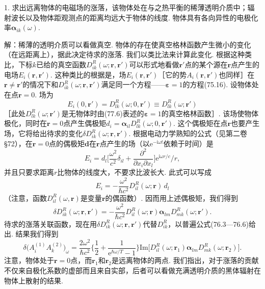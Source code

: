 \begin{xiti}

1. 求出远离物体的电磁场的涨落，该物体处在与之热平衡的稀薄透明介质中；辐射波长以及物体距观测点的距离均远大于物体的线度. 物体具有各向异性的电极化率$\bm{\alpha}_{ik}(\omega)$.

{\heiti 解：}稀薄的透明介质可以看做真空. 物体的存在使真空格林函数产生微小的变化（在远距离上），据此决定待求的涨落. 我们以类比法来计算此变化. 根据这种类比，下标$k$已给的真空函数$D_{ik}^{R}(\omega;\bm{r},\bm{r}')$可以形式地看做$\bm{r}'$点的某个源在$\bm{r}$点产生的电场$E_{i}(\bm{r},\bm{r}')$. 这种类比的根据是，场$E_{i}(\bm{r},\bm{r}')$［它的势$A_{i}(\bm{r},\bm{r}')$也同样］在$\bm{r}\neq\bm{r}'$的情况下和$D_{ik}^{R}(\omega;\bm{r},\bm{r}')$满足同一个方程——$\bm{\varepsilon}=1$的方程(75.16). 设物体处在点$\bm{r}=0$. 场为
\begin{equation*}
E_{i}(0,\bm{r}')=D_{lk}^{R}(\omega;0,\bm{r}')\equiv D_{lk}^{R}(\omega;\bm{r}')
\end{equation*}
［此处$D_{lk}^{R}(\omega;\bm{r}')$是无物体时由(77.6)表述的$\bm{\varepsilon}=1$的真空格林函数］. 该场使物体极化，同时在$\bm{r}=0$点产生偶极矩$d_{i}=\bm{\alpha}_{il}D_{lk}^{R}(\omega;0,\bm{r}')$. 这个偶极矩在点$\bm{r}$也要产生场，它将给出待求的变化$\delta D_{ik}^{R}(\omega;\bm{r},\bm{r}')$. 根据电动力学熟知的公式（见第二卷§72），在$\bm{r}=0$点的偶极矩$\bm{d}$在$\bm{r}$点产生的场（以$\mathrm{e}^{-\mathrm{i}\omega t}$依赖于时间）是
\begin{equation*}
E_{i}=d_{l}\biggl[\frac{\omega^{2}}{c^{2}}\delta_{il}+\frac{\partial^{2}}{\partial x_{i}\partial x_{l}}\biggr]\mathrm{e}^{\mathrm{i}\omega r/c}/r,
\end{equation*}
并且只要求距离$r$比物体的线度大，不要求比波长大. 此式可以写成
\begin{equation*}
E_{i}=-\frac{\omega^{2}}{\hbar c^{2}}D_{il}^{R}(\omega;\bm{r})\,d_{l}
\end{equation*}
（注意，函数$D_{il}^{R}(\omega,\bm{r})$是变量$\bm{r}$的偶函数）. 因而用上述偶极矩，我们得到
\begin{equation*}
\delta D_{ik}^{R}(\omega;\bm{r},\bm{r}')=-\frac{\omega^{2}}{\hbar c^{2}}D_{il}^{R}(\omega;\bm{r})\bm{\alpha}_{lm}D_{mk}^{R}(\omega;\bm{r}').
\end{equation*}
待求的涨落关联函数，现在用$\delta D_{ik}^{R}(\omega;\bm{r},\bm{r}')$代替$D_{ik}^{R}$，以普遍公式(76.3—76.6)给出. 结果我们得到
\begin{equation}\tag{1}
\delta\bigl(A_{i}^{(1)}A_{k}^{(2)}\bigr)_{\omega}=\frac{2\omega^{2}}{\hbar c^{2}}
\biggl\{\frac{1}{2}+\frac{1}{\mathrm{e}^{\hbar\omega/T}-1}\biggr\}
\mathrm{Im}\bigl[D_{il}^{R}(\omega;\bm{r}_{1})\bm{\alpha}_{lm}D_{mk}^{R}(\omega;\bm{r}_{2})\bigr].
\end{equation}
注意，物体处于$\bm{r}=0$点，而$\bm{r}_{1}$和$\bm{r}_{2}$是远离物体的两点. 我们指出，对于涨落的贡献不仅来自极化系数的虚部而且来自实部，后者可以看做充满透明介质的黑体辐射在物体上散射的结果.


\end{xiti}
